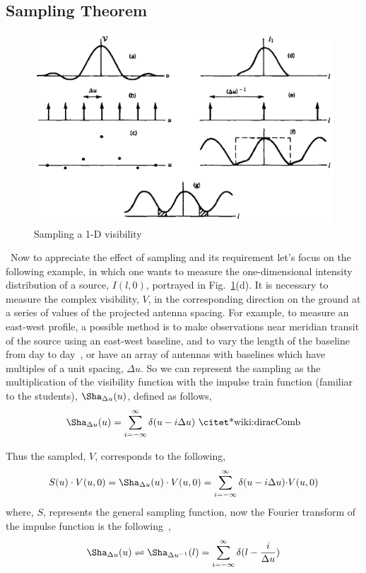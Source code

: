 \subsection{Sampling Theorem}
\label{sec:sampTheo}
\begin{figure}[htbp]
\center
    \includegraphics[scale= 0.3]{Figures/sampling}
 	\caption[Sampling a 1-D visibility  ]{Sampling a 1-D visibility~\citep[Pg.~126,~Fig.~5.2]{thompson2008interferometry}}
	\label{fig:Sampling1D}
\end{figure}
{\citep[From][~Sec.~5.2]{thompson2008interferometry}}~Now to appreciate the effect of sampling and its requirement let's focus on the following example, in which one wants to measure the one-dimensional intensity distribution of a source, $I(l,0)$, portrayed in Fig.~\ref{fig:Sampling1D}{\color{blue}(d)}. It is necessary to measure the complex visibility, $V$, in the corresponding direction on the ground at a series of values of the projected antenna spacing. For example, to measure an east-west profile, a possible method is to make observations near meridian transit of the source using an east-west baseline, and to vary the length of the baseline from day to day~\citep[Pg. 126]{thompson2008interferometry}, or have an array of antennas with baselines which have multiples of a unit spacing, $\Delta{u}$. So we can represent the sampling as the multiplication of the visibility function with the impulse train function (familiar to the students), $\Sha_{\Delta{u}}(u)$, defined as follows,
\begin{equation}
\Sha_{\Delta{u}}(u) = \sum^{\infty}_{i = -\infty}\delta(u - i\Delta{u})\textrm{~\citet*{wiki:diracComb}}
\end{equation}

Thus the sampled, $V$, corresponds to the following,
\begin{equation}
S(u)\cdot{V(u,0)} = \Sha_{\Delta{u}}(u)\cdot{V(u,0)} = \sum^{\infty}_{i = -\infty}\delta(u - i\Delta{u}){\cdot}{V(u,0)}
\end{equation}
where, $S$, represents the general sampling function,
now the Fourier transform of the impulse function is the following{~\citep[Pg. 127,~Eq.~5.6]{thompson2008interferometry}},
\begin{equation}
\Sha_{\Delta{u}}(u) \rightleftharpoons \Sha_{\Delta{u}^{-1}}(l) = \sum^{\infty}_{i = -\infty}\delta(l - \frac{i}{\Delta{u}})
\end{equation}

